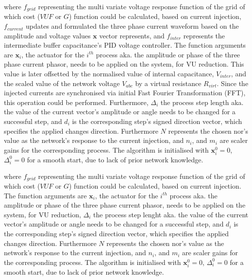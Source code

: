         where $f_{grid}$ representing the multi variate voltage response function of the grid of which cost ($VUF$ or $G$)
        function could be calculated, based on current injection, $f_{current}$ updates and formulated the three phase current waveform based on the amplitude and voltage values $\textbf{x}$ vector represents, and $f_{inter}$ represents the intermediate buffer capacitance's PID voltage controller. The function arguments are $\textbf{x}_i$, the actuator for the $i^{th}$ process aka. the amplitude or phase of the three phase current phasor, needs to be applied on the system, for VU reduction. This value is later offsetted by the normalised value of internal capacitance, $V_{inter}$, and the scaled value of the network voltage $V_{abc}$ by a virtual resistance $R_{virt}$. Since the injected currents are synchronised via initial Fast Fourier Transformation (FFT), this operation could be performed. Furthermore, $\Delta_i$ the process step length aka. the value of the current vector's amplitude or angle needs to be changed for a successful step, and $d_i$ is the corresponding step's signed direction vector, which specifies the applied changes direction. Furthermore $N$ represents the chosen nor's value as the network's response to the current injection, and $n_i$, and $m_i$ are scaler gains for the corresponding process. The algorithm is initialised with $\textbf{x}_i^0=0$, $\Delta_i^0=0$ for a smooth start, due to lack of prior network knowledge.

        where $f_{grid}$ representing the multi variate voltage response function of the grid of which cost ($VUF$ or $G$)
        function could be calculated, based on current injection. The function arguments are $\textbf{x}_i$, the actuator for the $i^{th}$ process aka. the amplitude or phase of the three phase current phasor, needs to be applied on the system, for VU reduction, $\Delta_i$ the process step lenght aka. the value of the current vector's amplitude or angle needs to be changed for a successful step, and $d_i$ is the corresponding step's signed direction vector, which specifies the applied changes direction. Furthermore $N$ represents the chosen nor's value as the network's response to the current injection, and $n_i$, and $m_i$ are scaler gains for the corresponding process. The algorithm is initialised with $\textbf{x}_i^0=0$, $\Delta_i^0=0$ for a smooth start, due to lack of prior network knowledge.

